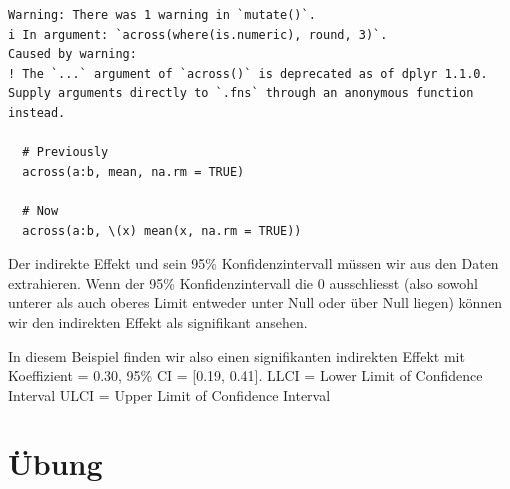 \documentclass[
  letterpaper,
  DIV=11,
  numbers=noendperiod]{scrreprt}
\newenvironment{Shaded}{\begin{snugshade}}{\end{snugshade}}
\newcommand{\AttributeTok}[1]{\textcolor[rgb]{0.40,0.45,0.13}{#1}}
\newcommand{\CommentTok}[1]{\textcolor[rgb]{0.37,0.37,0.37}{#1}}
\newcommand{\ConstantTok}[1]{\textcolor[rgb]{0.56,0.35,0.01}{#1}}
\newcommand{\DecValTok}[1]{\textcolor[rgb]{0.68,0.00,0.00}{#1}}
\newcommand{\FloatTok}[1]{\textcolor[rgb]{0.68,0.00,0.00}{#1}}
\newcommand{\FunctionTok}[1]{\textcolor[rgb]{0.28,0.35,0.67}{#1}}
\newcommand{\NormalTok}[1]{\textcolor[rgb]{0.00,0.23,0.31}{#1}}
\newcommand{\OtherTok}[1]{\textcolor[rgb]{0.00,0.23,0.31}{#1}}
\newcommand{\SpecialCharTok}[1]{\textcolor[rgb]{0.37,0.37,0.37}{#1}}
\newcommand{\StringTok}[1]{\textcolor[rgb]{0.13,0.47,0.30}{#1}}
\begin{document}
\begin{Shaded}
\end{Shaded}

\begin{verbatim}
Warning: There was 1 warning in `mutate()`.
i In argument: `across(where(is.numeric), round, 3)`.
Caused by warning:
! The `...` argument of `across()` is deprecated as of dplyr 1.1.0.
Supply arguments directly to `.fns` through an anonymous function instead.

  # Previously
  across(a:b, mean, na.rm = TRUE)

  # Now
  across(a:b, \(x) mean(x, na.rm = TRUE))
\end{verbatim}

Der indirekte Effekt und sein 95\% Konfidenzintervall müssen wir aus den
Daten extrahieren. Wenn der 95\% Konfidenzintervall die 0 ausschliesst
(also sowohl unterer als auch oberes Limit entweder unter Null oder über
Null liegen) können wir den indirekten Effekt als signifikant ansehen.

In diesem Beispiel finden wir also einen signifikanten indirekten Effekt
mit Koeffizient = 0.30, 95\% CI = {[}0.19, 0.41{]}. LLCI = Lower Limit
of Confidence Interval ULCI = Upper Limit of Confidence Interval

\section{Übung}\label{uxfcbung-2}
\end{document}
